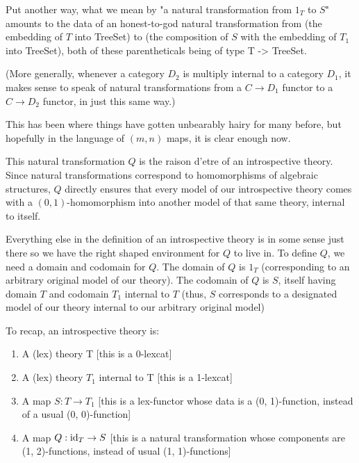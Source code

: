 \begin{enumerate}
Put another way, what we mean by "a natural transformation from $1_T$ to $S$" amounts to the data of an honest-to-god natural transformation from (the embedding of $T$ into TreeSet) to (the composition of $S$ with the embedding of $T_1$ into TreeSet), both of these parentheticals being of type T -> TreeSet.

(More generally, whenever a category $D_2$ is multiply internal to a category $D_1$, it makes sense to speak of natural transformations from a $C \to D_1$ functor to a $C \to D_2$ functor, in just this same way.)

This has been where things have gotten unbearably hairy for many before, but hopefully in the language of $(m, n)$ maps, it is clear enough now.

This natural transformation $Q$ is the raison d'etre of an introspective theory. Since natural transformations correspond to homomorphisms of algebraic structures, $Q$ directly ensures that every model of our introspective theory comes with a $(0, 1)$-homomorphism into another model of that same theory, internal to itself.

Everything else in the definition of an introspective theory is in some sense just there so we have the right shaped environment for $Q$ to live in. To define $Q$, we need a domain and codomain for $Q$. The domain of $Q$ is $1_T$ (corresponding to an arbitrary original model of our theory). The codomain of $Q$ is $S$, itself having domain $T$ and codomain $T_1$ internal to $T$ (thus, $S$ corresponds to a designated model of our theory internal to our arbitrary original model)
\end{enumerate}

To recap, an introspective theory is:
\begin{enumerate}

\item 
 A (lex) theory T [this is a 0-lexcat]

\item
A (lex) theory $T_1$ internal to T [this is a 1-lexcat]

\item
A map $S : T \to T_1$ [this is a lex-functor whose data is a (0, 1)-function, instead of a usual (0, 0)-function]

\item
A map $Q : \mathrm{id}_T \to S$ [this is a natural transformation whose components are (1, 2)-functions, instead of usual (1, 1)-functions]

\end{enumerate}


